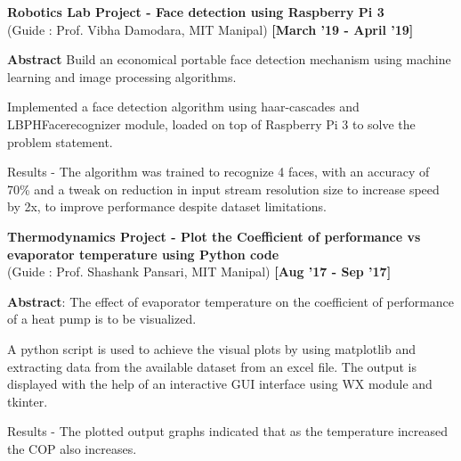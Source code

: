 \documentclass[a4paper,10pt]{article}
\begin{document}
\begin{itemize*}
  \setlength{\itemsep}{1pt}
  \item \textbf{Robotics Lab Project - Face detection using Raspberry Pi 3} \\
{(Guide : Prof. Vibha Damodara, MIT Manipal)}  
\hfill {\small{{\textbf{[March '19 - April '19]}}\/}}
\begin{itemize*}

  \setlength{\itemsep}{.00pt}
      \item \textbf{Abstract} Build an economical portable face detection mechanism using machine learning and image processing algorithms.
      \item Implemented a face detection algorithm using haar-cascades and LBPHFacerecognizer module, loaded on top of Raspberry Pi 3 to solve the problem statement.
	  \item Results - The algorithm was trained to recognize 4 faces, with an accuracy of 70\% and a tweak on reduction in input stream resolution size to increase speed by 2x, to improve performance despite dataset limitations.
\end{itemize*}
\end{itemize*}



\begin{itemize*}
  \setlength{\itemsep}{1pt}
  \item \textbf{Thermodynamics Project - Plot the Coefficient of performance vs evaporator temperature using Python code
}  \\
{(Guide : Prof. Shashank Pansari, MIT Manipal)} \hfill {\small{{\textbf{[Aug '17 - Sep '17]}}\/}}
\begin{itemize*}
  \setlength{\itemsep}{.00pt}
      \item \textbf{Abstract}: The effect of evaporator temperature on the coefficient of performance of a heat pump is to be visualized.
      \item  A python script is used to achieve the visual plots by using matplotlib and extracting data from the available dataset from an excel file.
The output is displayed with the help of an interactive GUI interface using WX module
and tkinter.
	  \item Results - The plotted output graphs indicated that as the temperature increased the COP also increases.
  
\end{itemize*}
\end{itemize*}
\end{document}
